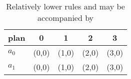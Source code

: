 \documentclass[a4paper]{article}
\begin{document}
\begin{table}
\begin{adjustbox}{width=0.7\columnwidth}
\begin{tabular}{|l|l|l|l|l|}
\hline
\textbf{plan} & \multicolumn{1}{c|}{\textbf{0}} & \multicolumn{1}{c|}{\textbf{1}} & \multicolumn{1}{c|}{\textbf{2}} & \multicolumn{1}{c|}{\textbf{3}} \\ \hline
\textbf{$a_0$}  & (0,0) & (1,0) & (2,0) & (3,0) \\ \hline
\textbf{$a_1$}  & (0,0) & (1,0) & (2,0) & (3,0) \\ \hline
\end{tabular}
\end{adjustbox}
\caption{Relatively lower rules and may be accompanied by 
}
\end{table}
\end{document}
